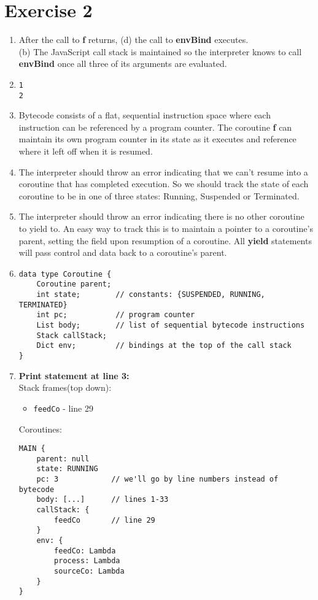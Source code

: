 \documentclass[11pt]{article}
\begin{document}
\section*{Exercise 2}
\begin{enumerate}[(P1)]
\item After the call to \textbf{f} returns, (d) the call to \textbf{envBind} executes.\\
(b) The JavaScript call stack is maintained so the interpreter knows to call \textbf{envBind} once all three of its arguments are evaluated.
\item \begin{verbatim}
1
2
\end{verbatim}
\item Bytecode consists of a flat, sequential instruction space where each instruction can be referenced by a program counter. The coroutine \textbf{f} can maintain its own program counter in its state as it executes and reference where it left off when it is resumed.
\item The interpreter should throw an error indicating that we can't resume into a coroutine that has completed execution. So we should track the state of each coroutine to be in one of three states: Running, Suspended or Terminated.
\item The interpreter should throw an error indicating there is no other coroutine to yield to. An easy way to track this is to maintain a pointer to a coroutine's parent, setting the field upon resumption of a coroutine. All \textbf{yield} statements will pass control and data back to a coroutine's parent.
\item \begin{verbatim}
data type Coroutine {
    Coroutine parent;
    int state;        // constants: {SUSPENDED, RUNNING, TERMINATED}
    int pc;           // program counter
    List body;        // list of sequential bytecode instructions
    Stack callStack;
    Dict env;         // bindings at the top of the call stack
}
\end{verbatim}
\item \textbf{Print statement at line 3:}\\
Stack frames(top down): \begin{itemize}
\item \texttt{feedCo} - line 29
\end{itemize}
Coroutines: \begin{verbatim}
MAIN {
    parent: null
    state: RUNNING
    pc: 3            // we'll go by line numbers instead of bytecode
    body: [...]      // lines 1-33
    callStack: {
        feedCo       // line 29
    }
    env: {
        feedCo: Lambda
        process: Lambda
        sourceCo: Lambda
    }
}


\end{verbatim}
\end{enumerate}
\end{document}
